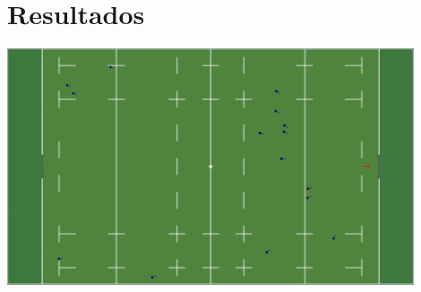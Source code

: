 \section{Resultados}\label{sec:resultados}

\begin{frame}
    \begin{center}
        \includegraphics[width=0.9\textwidth]{pic/05-resultados/animation-preview}
    \end{center}
\end{frame}